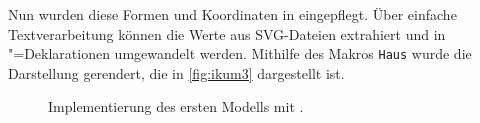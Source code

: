 Nun wurden diese Formen und Koordinaten in \Povray eingepflegt. Über einfache Textverarbeitung können die Werte aus SVG-Dateien extrahiert und in \Povray"=Deklarationen umgewandelt werden. Mithilfe des Makros \texttt{Haus} wurde die Darstellung gerendert, die in \autoref{fig:ikum3} dargestellt ist.

\begin{figure}[h]
	\centering
	\caption{Implementierung des ersten Modells mit \Povray.}
	\label{fig:ikum3}
\end{figure}
